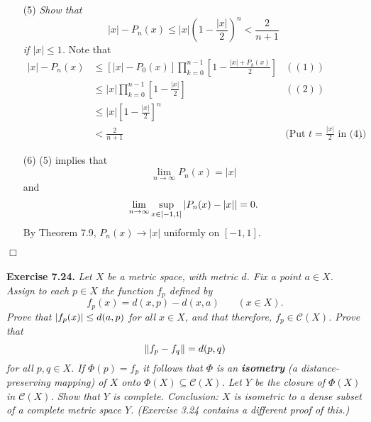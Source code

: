 \documentclass{article}
\begin{document}
\begin{enumerate}
\item[(5)]
\emph{Show that
\[
  |x| - P_n(x) \leq |x| \left(1-\frac{|x|}{2}\right)^n < \frac{2}{n+1}
\]
if $|x| \leq 1$.}
Note that
\begin{align*}
  |x| - P_n(x)
  &\leq [ |x| - P_0(x) ] \prod_{k=0}^{n-1}\left[1-\frac{|x|+P_k(x)}{2}\right]
    & ((1)) \\
  &\leq |x| \prod_{k=0}^{n-1}\left[1-\frac{|x|}{2}\right]
    & ((2)) \\
  &\leq |x| \left[1-\frac{|x|}{2}\right]^n \\
  & < \frac{2}{n+1}
    & \text{(Put $t=\frac{|x|}{2}$ in (4))}.
\end{align*}

\item[(6)]
(5) implies that
\[
  \lim_{n \to \infty} P_n(x) = |x|
\]
and
\[
  \lim_{n \to \infty} \sup_{x \in [-1,1]}\abs{ P_n(x) - |x| } = 0.
\]
By Theorem 7.9, $P_n(x) \to |x|$ uniformly on $[-1,1]$.
\end{enumerate}
$\Box$ \\\\






\textbf{Exercise 7.24.}
\emph{Let $X$ be a metric space, with metric $d$.
Fix a point $a \in X$.
Assign to each $p \in X$ the function $f_p$ defined by
\[
  f_p(x) = d(x,p) - d(x,a)
  \:\:\:\:\:\:\:\:
  (x \in X).
\]
Prove that $\abs{ f_p(x) } \leq d(a,p)$ for all $x \in X$,
and that therefore, $f_p \in \mathscr{C}(X)$.
Prove that
\[
  \norm{ f_p - f_q } = d(p,q)
\]
for all $p,q \in X$.
If $\Phi(p) = f_p$ it follows that $\Phi$ is an \textbf{isometry}
(a distance-preserving mapping)
of $X$ onto $\Phi(X) \subseteq \mathscr{C}(X)$.
Let $Y$ be the closure of $\Phi(X)$ in $\mathscr{C}(X)$.
Show that $Y$ is complete.
Conclusion: $X$ is isometric to a dense subset of a complete metric space $Y$.
(Exercise 3.24 contains a different proof of this.)} \\
\end{document}
